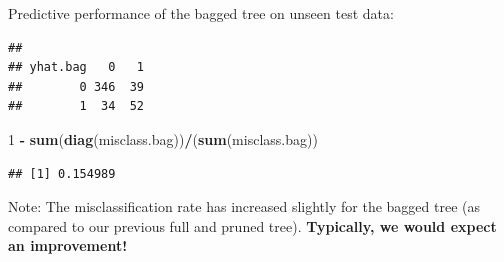 \documentclass[10pt,ignorenonframetext,]{beamer}
\newenvironment{Shaded}{\begin{snugshade}}{\end{snugshade}}
\newcommand{\KeywordTok}[1]{\textcolor[rgb]{0.13,0.29,0.53}{\textbf{#1}}}
\newcommand{\DataTypeTok}[1]{\textcolor[rgb]{0.13,0.29,0.53}{#1}}
\newcommand{\DecValTok}[1]{\textcolor[rgb]{0.00,0.00,0.81}{#1}}
\newcommand{\StringTok}[1]{\textcolor[rgb]{0.31,0.60,0.02}{#1}}
\newcommand{\OperatorTok}[1]{\textcolor[rgb]{0.81,0.36,0.00}{\textbf{#1}}}
\newcommand{\NormalTok}[1]{#1}
\begin{document}
\begin{frame}[fragile]

Predictive performance of the bagged tree on unseen test data:

\scriptsize

\begin{Shaded}
\end{Shaded}

\begin{verbatim}
##         
## yhat.bag   0   1
##        0 346  39
##        1  34  52
\end{verbatim}

\begin{Shaded}
\begin{Highlighting}[]
\DecValTok{1} \OperatorTok{-}\StringTok{ }\KeywordTok{sum}\NormalTok{(}\KeywordTok{diag}\NormalTok{(misclass.bag))}\OperatorTok{/}\NormalTok{(}\KeywordTok{sum}\NormalTok{(misclass.bag))}
\end{Highlighting}
\end{Shaded}

\begin{verbatim}
## [1] 0.154989
\end{verbatim}

\normalsize

Note: The misclassification rate has increased slightly for the bagged
tree (as compared to our previous full and pruned tree).
\textbf{Typically, we would expect an improvement!}

\end{frame}
\end{document}
